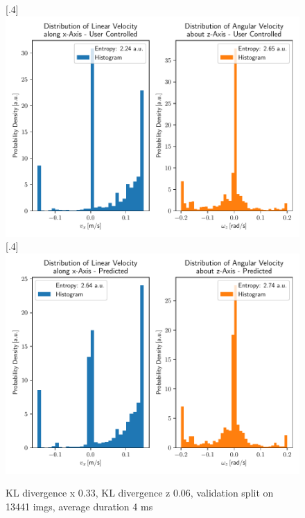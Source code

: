 \begin{figure}[h]
	\centering
	\subcaptionbox{}%
	[.4\linewidth]{\includegraphics[scale=.35]{chapters/05_experiments/02_autonomous_walking/user_entropy.pdf}}
	\subcaptionbox{}%
	[.4\linewidth]{\includegraphics[scale=.35]{chapters/05_experiments/02_autonomous_walking/predicted_entropy_kldivx_0_33_kldivz_0_06_imgs_13441_duration_4_ms.pdf}}
	\caption{KL divergence x 0.33, KL divergence z 0.06, validation split on 13441 imgs, average duration 4 ms}
	\label{fig::524_training_dist}
\end{figure}
